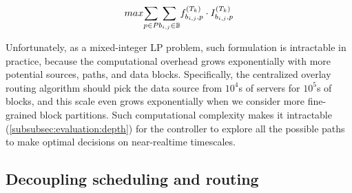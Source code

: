 \begin{equation}
\centering
max \displaystyle{\sum_{p\in P}} \displaystyle{\sum_{b_{i,j}\in \mathbb{B}}} f_{b_{i,j},p}^{(T_k)} \cdot I_{b_{i,j},p}^{(T_k)}
\label{equation:objective}
\end{equation}



Unfortunately, as a mixed-integer LP problem, such formulation is intractable in practice, because the computational overhead grows exponentially with more potential sources, paths, and data blocks. Specifically, the centralized overlay routing algorithm should pick the data source from $10^4$s of servers for $10^5$s of blocks, and this scale even grows exponentially when we consider more fine-grained block partitions. Such computational complexity makes it intractable (\Section\ref{subsubsec:evaluation:depth}) for the controller to explore all the possible paths to make optimal decisions on near-realtime timescales.


\subsection{Decoupling scheduling and routing}
\label{subsec:logic:separation}

